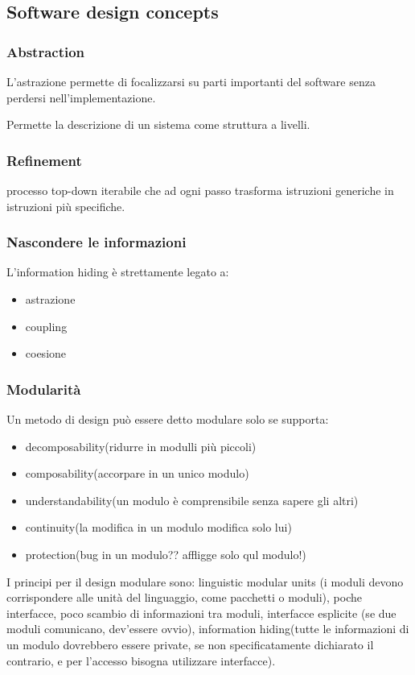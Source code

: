 \documentclass{article}
\begin{document}
\subsection{Software design concepts}
\subsubsection{Abstraction}
L'astrazione permette di focalizzarsi su parti importanti del software senza perdersi nell'implementazione.

Permette la descrizione di un sistema come struttura a
livelli.

\subsubsection{Refinement}
processo top-down iterabile che ad ogni passo trasforma istruzioni generiche in istruzioni più specifiche.
\subsubsection{Nascondere le informazioni}


L'information hiding è strettamente legato a:
\begin{itemize}
    \item astrazione
    \item coupling
    \item coesione
\end{itemize}

\subsubsection{Modularità}

Un metodo di design può essere detto modulare solo se supporta:
\begin{itemize}
    \item decomposability(ridurre in modulli più piccoli)
    \item composability(accorpare in un unico modulo)
    \item understandability(un modulo è comprensibile senza sapere gli altri)
    \item continuity(la modifica in un modulo modifica solo lui)
    \item protection(bug in un modulo?? affligge solo qul modulo!)
\end{itemize}

I principi per il design modulare sono: linguistic modular units (i moduli devono corrispondere alle
unità del linguaggio, come pacchetti o moduli), poche interfacce, poco scambio di informazioni tra
moduli, interfacce esplicite (se due moduli comunicano, dev'essere ovvio), information hiding(tutte
le informazioni di un modulo dovrebbero essere private, se non specificatamente dichiarato il contrario, e
per l'accesso bisogna utilizzare interfacce).
\end{document}
